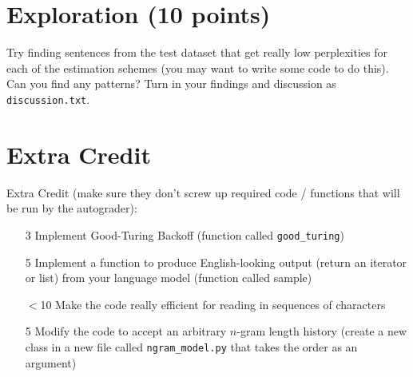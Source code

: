 \documentclass[11pt]{article}
\begin{document}
\section{Exploration (10 points)}

Try finding sentences from the test dataset that get really low perplexities for each of the estimation schemes (you may want to write some code to do this).  Can you find any patterns?  Turn in your findings and discussion as \texttt{discussion.txt}.

\section*{Extra Credit}

Extra Credit (make sure they don't screw up required code / functions that will be run by the autograder):
\begin{itemize}
\item[3] Implement Good-Turing Backoff (function called \texttt{good\_turing})
\item[5] Implement a function to produce English-looking output (return an iterator or list) from your language model (function called sample)
\item[$<$10] Make the code really efficient for reading in sequences of characters
\item[5] Modify the code to accept an arbitrary $n$-gram length history (create a new class in a new file called \texttt{ngram\_model.py} that takes the order as an argument)
\end{itemize}
\end{document}
